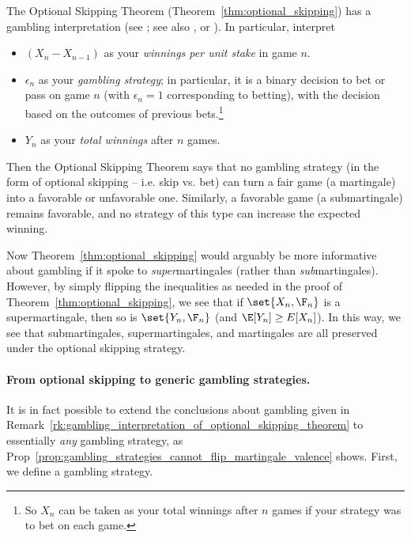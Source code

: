\documentclass{article} %
\begin{document}
\begin{remark}
 The Optional Skipping Theorem (Theorem~\ref{thm:optional_skipping}) has a gambling interpretation (see \cite[pp. 257]{ash2000probability}; see also  \cite{durrett2010probability}, or \cite[Prop 3.1]{brzezniak2000basic}).  In particular, interpret
%
\begin{itemize}
\item  $(X_n-X_{n-1})$ as your \textit{winnings per unit stake} in game $n$.
\item  $\epsilon_n$ as your \textit{gambling strategy}; in particular, it is a binary decision to bet or pass on game $n$ (with $\epsilon_n =1$ corresponding to betting), with the decision based on the outcomes of previous bets.\footnote{So $X_n$ can be taken as your total winnings after $n$ games if your strategy was to bet on each game.}
\item $Y_n$ as your \textit{total winnings} after $n$ games.
\end{itemize}

Then the Optional Skipping Theorem says that no gambling strategy (in the  form of optional skipping -- i.e. skip vs. bet) can turn a fair game (a martingale) into a favorable or unfavorable one. Similarly, a favorable game (a submartingale) remains favorable, and no strategy of this type can increase the expected winning.

 Now Theorem~\ref{thm:optional_skipping} would arguably be more informative about gambling if it spoke to \textit{super}martingales (rather than \textit{sub}martingales).  However, by simply flipping the inequalities as needed in the proof of Theorem~\ref{thm:optional_skipping}, we see that if  $\set{X_n, \F_n}$   is a supermartingale, then so is $\set{Y_n, \F_n}$ (and $\E[Y_n] \geq E[X_n]$).   In this way, we see that submartingales, supermartingales, and martingales are all preserved under the optional skipping strategy.  

\label{rk:gambling_interpretation_of_optional_skipping_theorem}
\end{remark}


\paragraph{From optional skipping to generic gambling strategies.}

It is in fact possible to extend the conclusions about gambling given in Remark~\ref{rk:gambling_interpretation_of_optional_skipping_theorem}  to essentially \textit{any} gambling strategy, as Prop~\ref{prop:gambling_strategies_cannot_flip_martingale_valence} shows.  First, we define a gambling strategy.
\end{document}
